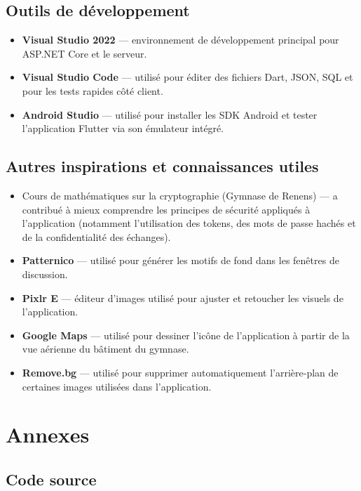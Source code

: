 \documentclass[12pt]{report}
\begin{document}
\section{Outils de développement}

\begin{itemize}
	\item \textbf{Visual Studio 2022} — environnement de développement principal pour ASP.NET Core et le serveur.
	\item \textbf{Visual Studio Code} — utilisé pour éditer des fichiers Dart, JSON, SQL et pour les tests rapides côté client.
	\item \textbf{Android Studio} — utilisé pour installer les SDK Android et tester l’application Flutter via son émulateur intégré.
\end{itemize}

\section{Autres inspirations et connaissances utiles}

\begin{itemize}
	\item Cours de mathématiques sur la cryptographie (Gymnase de Renens) — a contribué à mieux comprendre les principes de sécurité appliqués à l’application (notamment l’utilisation des tokens, des mots de passe hachés et de la confidentialité des échanges).
	\item \textbf{Patternico} — utilisé pour générer les motifs de fond dans les fenêtres de discussion.
	\item \textbf{Pixlr E} — éditeur d’images utilisé pour ajuster et retoucher les visuels de l’application.
	\item \textbf{Google Maps} — utilisé pour dessiner l’icône de l’application à partir de la vue aérienne du bâtiment du gymnase.
	\item \textbf{Remove.bg} — utilisé pour supprimer automatiquement l’arrière-plan de certaines images utilisées dans l’application.
\end{itemize}


\chapter{Annexes}

\section{Code source}
\end{document}
